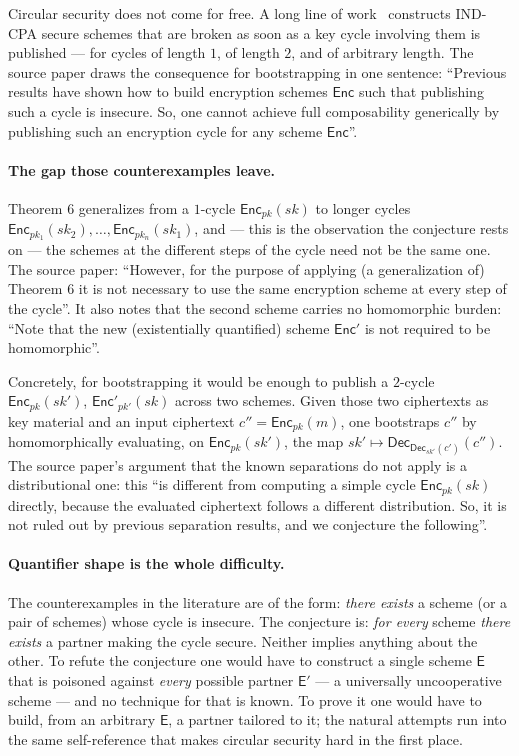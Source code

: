\documentclass{conjura-conjecture}
\newcommand{\Enc}{\mathsf{Enc}}
\newcommand{\Dec}{\mathsf{Dec}}
\begin{document}
Circular security does not come for free. A long line of
work~\cite{KRW15,KW16,AP16,GKW17a,GKW17b,HK17} constructs IND-CPA
secure schemes that are broken as soon as a key cycle involving them is
published --- for cycles of length $1$, of length $2$, and of arbitrary
length. The source paper draws the consequence for bootstrapping in one
sentence: ``Previous results have shown how to build encryption schemes
$\Enc$ such that publishing such a cycle is insecure. So, one cannot
achieve full composability generically by publishing such an encryption
cycle for any scheme $\Enc$''.

\paragraph{The gap those counterexamples leave.}
Theorem 6 generalizes from a $1$-cycle $\Enc_{pk}(sk)$ to longer cycles
$\Enc_{pk_{1}}(sk_{2}), \dots, \Enc_{pk_{n}}(sk_{1})$, and --- this is
the observation the conjecture rests on --- the schemes at the
different steps of the cycle need not be the same one. The source
paper: ``However, for the purpose of applying (a generalization of)
Theorem 6 it is not necessary to use the same encryption scheme at
every step of the cycle''. It also notes that the second scheme carries
no homomorphic burden: ``Note that the new (existentially quantified)
scheme $\Enc'$ is not required to be homomorphic''.

Concretely, for bootstrapping it would be enough to publish a $2$-cycle
$\Enc_{pk}(sk')$, $\Enc'_{pk'}(sk)$ across two schemes. Given those two
ciphertexts as key material and an input ciphertext
$c'' = \Enc_{pk}(m)$, one bootstraps $c''$ by homomorphically
evaluating, on $\Enc_{pk}(sk')$, the map $sk' \mapsto
\Dec_{\Dec_{sk'}(c')}(c'')$. The source paper's argument that the known
separations do not apply is a distributional one: this ``is different
from computing a simple cycle $\Enc_{pk}(sk)$ directly, because the
evaluated ciphertext follows a different distribution. So, it is not
ruled out by previous separation results, and we conjecture the
following''.

\paragraph{Quantifier shape is the whole difficulty.}
The counterexamples in the literature are of the form: \emph{there
exists} a scheme (or a pair of schemes) whose cycle is insecure. The
conjecture is: \emph{for every} scheme \emph{there exists} a partner
making the cycle secure. Neither implies anything about the other. To
refute the conjecture one would have to construct a single scheme
$\mathsf{E}$ that is poisoned against \emph{every} possible partner
$\mathsf{E}'$ --- a universally uncooperative scheme --- and no
technique for that is known. To prove it one would have to build, from
an arbitrary $\mathsf{E}$, a partner tailored to it; the natural
attempts run into the same self-reference that makes circular security
hard in the first place.
\end{document}
